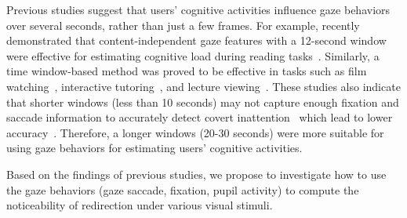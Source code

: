 Previous studies suggest that users' cognitive activities influence gaze behaviors over several seconds, rather than just a few frames. 
For example, \citeauthor{faber2018automated} recently demonstrated that content-independent gaze features with a 12-second window were effective for estimating cognitive load during reading tasks~\cite{faber2018automated}. 
Similarly, a time window-based method was proved to be effective in tasks such as film watching~\cite{mills2016automatic}, interactive tutoring~\cite{hutt2016eyes}, and lecture viewing~\cite{hutt2017gaze}. 
These studies also indicate that shorter windows (less than 10 seconds) may not capture enough fixation and saccade information to accurately detect covert inattention~\cite{bixler2016automatic, hutt2016eyes} which lead to lower accuracy~\cite{hutt2017gaze, hutt2016eyes}. 
Therefore, a longer windows (20-30 seconds) were more suitable for using gaze behaviors for estimating users' cognitive activities.

Based on the findings of previous studies, we propose to investigate how to use the gaze behaviors (gaze saccade, fixation, pupil activity) to compute the noticeability of redirection under various visual stimuli.



